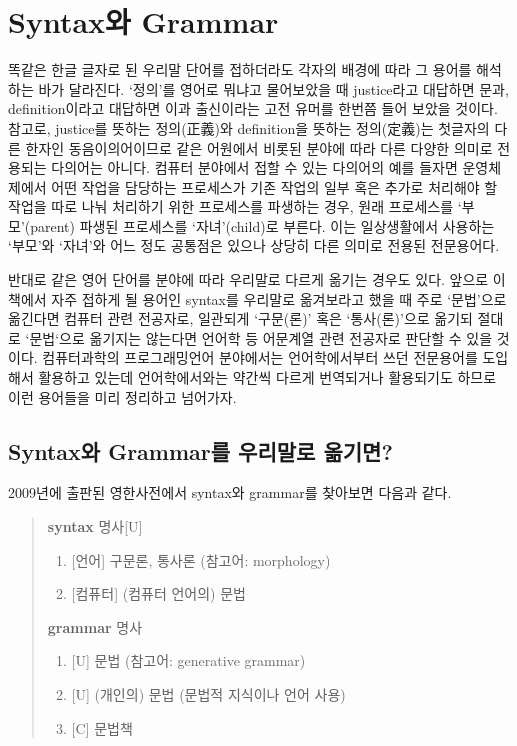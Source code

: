 
\chapter{Syntax와 Grammar}
\label{chap:SyntaxGrammar}
똑같은 한글 글자로 된 우리말 단어를 접하더라도 각자의 배경에 따라
그 용어를 해석하는 바가 달라진다. `정의'를 영어로 뭐냐고 물어보았을 때
justice라고 대답하면 문과, definition이라고 대답하면 이과 출신이라는
고전 유머를 한번쯤 들어 보았을 것이다. 참고로,
justice를 뜻하는 정의(正義)와 definition을 뜻하는 정의(定義)는
첫글자의 다른 한자인 동음이의어이므로 같은 어원에서 비롯된
분야에 따라 다른 다양한 의미로 전용되는 다의어는 아니다.
컴퓨터 분야에서 접할 수 있는 다의어의 예를 들자면 운영체제에서
어떤 작업을 담당하는 프로세스가 기존 작업의 일부 혹은 추가로
처리해야 할 작업을 따로 나눠 처리하기 위한 프로세스를 파생하는 경우,
원래 프로세스를 `부모'(parent) 파생된 프로세스를 `자녀'(child)로 부른다.
이는 일상생활에서 사용하는 `부모'와 `자녀'와 어느 정도 공통점은 있으나
상당히 다른 의미로 전용된 전문용어다.

반대로 같은 영어 단어를 분야에 따라 우리말로 다르게 옮기는 경우도 있다.
앞으로 이 책에서 자주 접하게 될 용어인 syntax를 우리말로 옮겨보라고
했을 때 주로 `문법'으로 옮긴다면 컴퓨터 관련 전공자로,
일관되게 `구문(론)' 혹은 `통사(론)'으로 옮기되 절대로 `문법`으로
옮기지는 않는다면 언어학 등 어문계열 관련 전공자로 판단할 수 있을 것이다.
컴퓨터과학의 프로그래밍언어 분야에서는 언어학에서부터 쓰던 전문용어를
도입해서 활용하고 있는데 언어학에서와는 약간씩 다르게 번역되거나
활용되기도 하므로 이런 용어들을 미리 정리하고 넘어가자.


\section{Syntax와 Grammar를 우리말로 옮기면?}

2009년에 출판된 영한사전\cite{OxEKdict}에서 syntax와 grammar를 찾아보면 다음과 같다.
\begin{quote}
    \textbf{syntax} 명사[U] \vspace{-1ex}
    \begin{enumerate}\tightlist
    \item{} [언어] 구문론, 통사론 (참고어: morphology)
    \item{} [컴퓨터] (컴퓨터 언어의) 문법
    \end{enumerate}
    \textbf{grammar} 명사 \vspace{-1ex}
    \begin{enumerate}\tightlist
    \item{} [U] 문법 (참고어: generative grammar)
    \item{} [U] (개인의) 문법 (문법적 지식이나 언어 사용)
    \item{} [C] 문법책
    \end{enumerate}
\end{quote}

